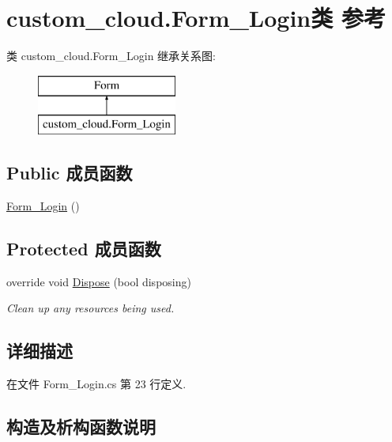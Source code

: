 \hypertarget{classcustom__cloud_1_1_form___login}{}\section{custom\+\_\+cloud.\+Form\+\_\+\+Login类 参考}
\label{classcustom__cloud_1_1_form___login}
类 custom\+\_\+cloud.\+Form\+\_\+\+Login 继承关系图\+:\begin{figure}[H]
\begin{center}
\leavevmode
\includegraphics[height=2.000000cm]{classcustom__cloud_1_1_form___login}
\end{center}
\end{figure}
\subsection*{Public 成员函数}
\begin{DoxyCompactItemize}
\item 
\hyperlink{classcustom__cloud_1_1_form___login_a02aed9f319f6c689211dd846389cd572}{Form\+\_\+\+Login} ()
\end{DoxyCompactItemize}
\subsection*{Protected 成员函数}
\begin{DoxyCompactItemize}
\item 
override void \hyperlink{classcustom__cloud_1_1_form___login_a2a799c7200f8378b56a85bf17994dc31}{Dispose} (bool disposing)
\begin{DoxyCompactList}\small\item\em Clean up any resources being used. \end{DoxyCompactList}\end{DoxyCompactItemize}


\subsection{详细描述}


在文件 Form\+\_\+\+Login.\+cs 第 23 行定义.



\subsection{构造及析构函数说明}
\mbox{\label{classcustom__cloud_1_1_form___login_a02aed9f319f6c689211dd846389cd572}} 
